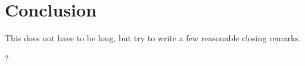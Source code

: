 \section{Conclusion}\label{sec:conclusion}
This does not have to be long, but try to write a few reasonable closing remarks.

?
